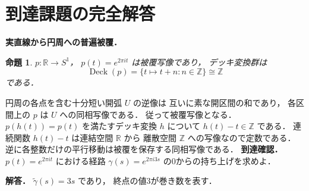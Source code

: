 \documentclass[a5paper,10pt,onecolumn]{jsarticle}
\makeatletter
\theoremstyle{mathnotetheorem}
\newtheorem{proposition}[theorem]{命題}
\renewcommand{\proofname}{証明}
\renewenvironment{proof}[1][\proofname]{%
  \par\pushQED{\qed}\normalfont\topsep4\p@\@plus2\p@\relax
  \trivlist\item[\hskip\labelsep\bfseries #1]\ignorespaces
}{\popQED\endtrivlist\@endpefalse}
\makeatother
\begin{document}
\section{到達課題の完全解答}
\noindent\textbf{実直線から円周への普遍被覆．}
\begin{proposition}
$p:\mathbb R\to S^1$，
$p(t)=e^{2\pi it}$ は被覆写像であり，
デッキ変換群は
\[
\operatorname{Deck}(p)
=\{t\mapsto t+n:n\in\mathbb Z\}
\cong\mathbb Z
\]
である．
\end{proposition}
\begin{proof}
円周の各点を含む十分短い開弧 $U$ の逆像は
互いに素な開区間の和であり，
各区間上の $p$ は $U$ への同相写像である．
従って被覆写像となる．
$p(h(t))=p(t)$ を満たすデッキ変換 $h$ について
$h(t)-t\in\mathbb Z$ である．
連続関数 $h(t)-t$ は連結空間 $\mathbb R$ から
離散空間 $\mathbb Z$ への写像なので定数である．
逆に各整数だけの平行移動は被覆を保存する同相写像である．
\end{proof}
\noindent\textbf{到達確認．}
$p(t)=e^{2\pi it}$ における経路
$\gamma(s)=e^{2\pi i3s}$ の0からの持ち上げを求めよ．
\par\noindent\textbf{解答．}
$\widetilde\gamma(s)=3s$ であり，
終点の値3が巻き数を表す．
\end{document}
